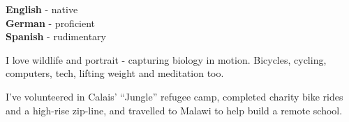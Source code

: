 \documentclass[9pt]{developercv} %
\begin{document}

\begin{minipage}[t]{0.2\textwidth} %
	\vspace{-\baselineskip} %

	\vspace{-0.5em}

	\textbf{English} - native\\
	\textbf{German} - proficient\\
	\textbf{Spanish} - rudimentary
\end{minipage}
\hfill %
\begin{minipage}[t]{0.3\textwidth} %
	\vspace{-\baselineskip} %
	
	\vspace{-0.5em}

	I love wildlife and portrait - capturing biology in motion. Bicycles, cycling, computers, tech, lifting weight and meditation too.
\end{minipage}
\hfill %
\begin{minipage}[t]{0.365\textwidth} %
	\vspace{-\baselineskip} %
	
	\vspace{-0.5em}
	
	I’ve volunteered in Calais’ “Jungle” refugee camp, completed charity bike rides and a high-rise zip-line, and travelled to Malawi to help build a remote school.
\end{minipage}

\end{document}
